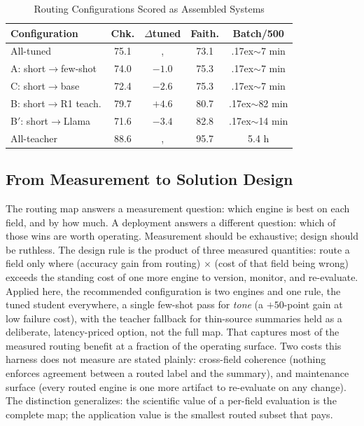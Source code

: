 \documentclass[10pt,journal]{IEEEtran}
\begin{document}
\begin{table}[t]
\centering
\caption{Routing Configurations Scored as Assembled Systems}
\label{tab:routing}
\small
\setlength{\tabcolsep}{4pt}\begin{tabular}{@{}lcccc@{}}
\toprule
Configuration & Chk. & $\Delta$tuned & Faith. & Batch/500 \\
\midrule
All-tuned & 75.1 &, & 73.1 & {\raise.17ex\hbox{$\scriptstyle\sim$}}7 min \\
A: short$\rightarrow$few-shot & 74.0 & $-1.0$ & 75.3 & {\raise.17ex\hbox{$\scriptstyle\sim$}}7 min \\
C: short$\rightarrow$base & 72.4 & $-2.6$ & 75.3 & {\raise.17ex\hbox{$\scriptstyle\sim$}}7 min \\
B: short$\rightarrow$R1 teach. & 79.7 & $+4.6$ & 80.7 & {\raise.17ex\hbox{$\scriptstyle\sim$}}82 min \\
B$'$: short$\rightarrow$Llama & 71.6 & $-3.4$ & 82.8 & {\raise.17ex\hbox{$\scriptstyle\sim$}}14 min \\
All-teacher & 88.6 &, & 95.7 & 5.4 h \\
\bottomrule
\end{tabular}
\end{table}

\subsection{From Measurement to Solution Design}\label{sec:design}
The routing map answers a measurement question: which engine is best on each field, and by how much. A deployment answers a different question: which of those wins are worth operating. Measurement should be exhaustive; design should be ruthless. The design rule is the product of three measured quantities: route a field only where (accuracy gain from routing) $\times$ (cost of that field being wrong) exceeds the standing cost of one more engine to version, monitor, and re-evaluate. Applied here, the recommended configuration is two engines and one rule, the tuned student everywhere, a single few-shot pass for \emph{tone} (a $+50$-point gain at low failure cost), with the teacher fallback for thin-source summaries held as a deliberate, latency-priced option, not the full map. That captures most of the measured routing benefit at a fraction of the operating surface. Two costs this harness does not measure are stated plainly: cross-field coherence (nothing enforces agreement between a routed label and the summary), and maintenance surface (every routed engine is one more artifact to re-evaluate on any change). The distinction generalizes: the scientific value of a per-field evaluation is the complete map; the application value is the smallest routed subset that pays.
\end{document}
